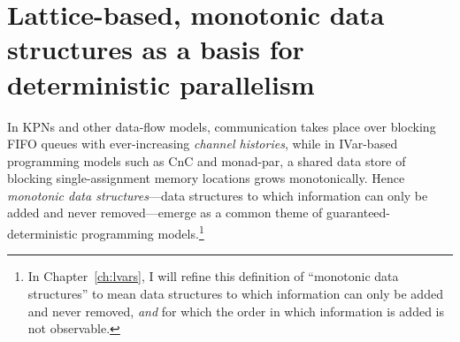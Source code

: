 \section{Lattice-based, monotonic data structures as a basis for deterministic parallelism}\label{s:intro-monotonic}

In KPNs and other data-flow models, communication takes place over
blocking FIFO queues with ever-increasing \emph{channel histories},
while in IVar-based programming models such as CnC and monad-par, a
shared data store of blocking single-assignment memory locations grows
monotonically.  Hence \emph{monotonic data structures}---data
structures to which information can only be added and never
removed---emerge as a common theme of guaranteed-deterministic
programming models.\footnote{In Chapter~\ref{ch:lvars}, I will refine
  this definition of ``monotonic data structures'' to mean data
  structures to which information can only be added and never removed,
  \emph{and} for which the order in which information is added is not
  observable.}

